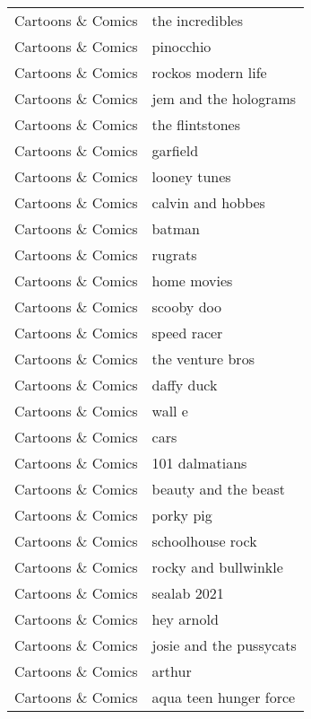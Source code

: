 \begin{supertabular}{l p{0.25\textwidth}}
Cartoons \& Comics &                    the incredibles \\
Cartoons \& Comics &                          pinocchio \\
Cartoons \& Comics &                 rockos modern life \\
Cartoons \& Comics &              jem and the holograms \\
Cartoons \& Comics &                    the flintstones \\
Cartoons \& Comics &                           garfield \\
Cartoons \& Comics &                       looney tunes \\
Cartoons \& Comics &                  calvin and hobbes \\
Cartoons \& Comics &                             batman \\
Cartoons \& Comics &                            rugrats \\
Cartoons \& Comics &                        home movies \\
Cartoons \& Comics &                         scooby doo \\
Cartoons \& Comics &                        speed racer \\
Cartoons \& Comics &                   the venture bros \\
Cartoons \& Comics &                         daffy duck \\
Cartoons \& Comics &                             wall e \\
Cartoons \& Comics &                               cars \\
Cartoons \& Comics &                     101 dalmatians \\
Cartoons \& Comics &               beauty and the beast \\
Cartoons \& Comics &                          porky pig \\
Cartoons \& Comics &                   schoolhouse rock \\
Cartoons \& Comics &               rocky and bullwinkle \\
Cartoons \& Comics &                        sealab 2021 \\
Cartoons \& Comics &                         hey arnold \\
Cartoons \& Comics &            josie and the pussycats \\
Cartoons \& Comics &                             arthur \\
Cartoons \& Comics &             aqua teen hunger force \\

\end{supertabular}
